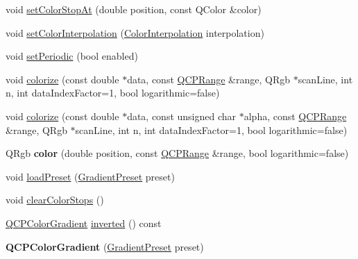 \begin{DoxyCompactItemize}
void \hyperlink{class_q_c_p_color_gradient_a3b48be5e78079db1bb2a1188a4c3390e}{set\+Color\+Stop\+At} (double position, const Q\+Color \&color)
\item 
void \hyperlink{class_q_c_p_color_gradient_aa13fda86406e1d896a465a409ae63b38}{set\+Color\+Interpolation} (\hyperlink{class_q_c_p_color_gradient_ac5dca17cc24336e6ca176610e7f77fc1}{Color\+Interpolation} interpolation)
\item 
void \hyperlink{class_q_c_p_color_gradient_a39d6448155fc00a219f239220d14bb39}{set\+Periodic} (bool enabled)
\item 
void \hyperlink{class_q_c_p_color_gradient_aaf423ceb943e177b0ed2c48c811d83dc}{colorize} (const double $\ast$data, const \hyperlink{class_q_c_p_range}{Q\+C\+P\+Range} \&range, Q\+Rgb $\ast$scan\+Line, int n, int data\+Index\+Factor=1, bool logarithmic=false)
\item 
void \hyperlink{class_q_c_p_color_gradient_acf0cc7fba83ef21f7b8d5d5258519db3}{colorize} (const double $\ast$data, const unsigned char $\ast$alpha, const \hyperlink{class_q_c_p_range}{Q\+C\+P\+Range} \&range, Q\+Rgb $\ast$scan\+Line, int n, int data\+Index\+Factor=1, bool logarithmic=false)
\item 
\mbox{\label{class_q_c_p_color_gradient_a0599545c859268b025d2060dea741cea}} 
Q\+Rgb {\bfseries color} (double position, const \hyperlink{class_q_c_p_range}{Q\+C\+P\+Range} \&range, bool logarithmic=false)
\item 
void \hyperlink{class_q_c_p_color_gradient_aa0aeec1528241728b9671bf8e60b1622}{load\+Preset} (\hyperlink{class_q_c_p_color_gradient_aed6569828fee337023670272910c9072}{Gradient\+Preset} preset)
\item 
void \hyperlink{class_q_c_p_color_gradient_a939213e85f0d1279519d555c5fcfb6ad}{clear\+Color\+Stops} ()
\item 
\hyperlink{class_q_c_p_color_gradient}{Q\+C\+P\+Color\+Gradient} \hyperlink{class_q_c_p_color_gradient_a9f72f501de429829ec446333316decda}{inverted} () const
\item 
\mbox{\label{class_q_c_p_color_gradient_a4e570b4004fd60bd135e52d685ed2b66}} 
{\bfseries Q\+C\+P\+Color\+Gradient} (\hyperlink{class_q_c_p_color_gradient_aed6569828fee337023670272910c9072}{Gradient\+Preset} preset)
\item 
\mbox{\label{class_q_c_p_color_gradient_a7f3478c33c59aa3c03b9ea1f809877fa}} 

\end{DoxyCompactItemize}
